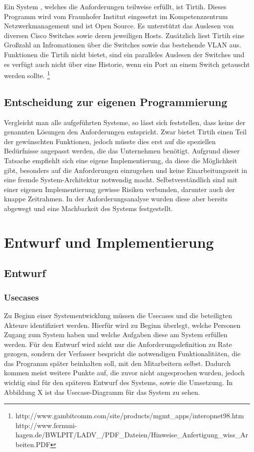 Ein System , welches die Anforderungen teilweise erfüllt, ist Tirtih.
Dieses Programm wird vom Fraunhofer Institut eingesetzt im Kompetenzzentrum Netzwerkmanagement und ist Open Source. Es unterstützt das Auslesen von diversen Cisco Switches sowie deren jeweiligen Hosts.
Zusätzlich liest Tirtih eine Großzahl an Infromationen über die Switches sowie das bestehende VLAN aus.
Funktionen die Tirtih nicht bietet, sind ein paralleles Auslesen der Switches und es verfügt auch nicht über eine Historie, wenn ein Port an einem Switch getauscht werden sollte.
\footnote{http://www.gambitcomm.com/site/products/mgmt\_apps/interopnet98.htm
http://www.fernuni-hagen.de/BWLPIT/LADV\_/PDF\_Dateien/Hinweise\_Anfertigung\_wiss\_Arbeiten.PDF}

\section{Entscheidung zur eigenen Programmierung}
\label{sec:decisionowncreating}

Vergleicht man alle aufgeführten Systeme, so lässt sich feststellen, dass keine der genannten Lösungen den Anforderungen entspricht.
Zwar bietet Tirtih einen Teil der gewünschten Funktionen, jedoch müsste dies erst auf die speziellen Bedürfnisse angepasst werden, die das Unternehmen benötigt.
Aufgrund dieser Tatsache empfiehlt sich eine eigene Implementierung, da diese die Möglichkeit gibt, besonders auf die Anforderungen einzugehen und keine Einarbeitungszeit in eine fremde System-Architektur notwendig macht.
Selbstverständlich sind mit einer eigenen Implementierung gewisse Risiken verbunden, darunter auch der knappe Zeitrahmen.
In der Anforderungsanalyse wurden diese aber bereits abgewegt und eine Machbarkeit des Systems festgestellt.

\chapter{Entwurf und Implementierung}
\label{cha:entw_imp}

\section{Entwurf}
\label{sec:Entwurf}


\subsection{Usecases}
\label{subsec:usecases}

Zu Beginn einer Systementwicklung müssen die Usecases und die beteiligten Akteure identifiziert werden.
Hierfür wird zu Beginn überlegt, welche Personen Zugang zum System haben und welche Aufgaben diese am System erfüllen werden.
Für den Entwurf wird nicht nur die Anforderungsdefinition zu Rate gezogen, sondern der Verfasser bespricht die notwendigen Funktionalitäten, die das Programm später beinhalten soll, mit den Mitarbeitern selbst.
Dadurch kommen meist weitere Punkte auf, die zuvor nicht angesprochen wurden, jedoch wichtig sind für den späteren Entwurf des Systems, sowie die Umsetzung.
In Abbildung X ist das Usecase-Diagramm für das System zu sehen.

